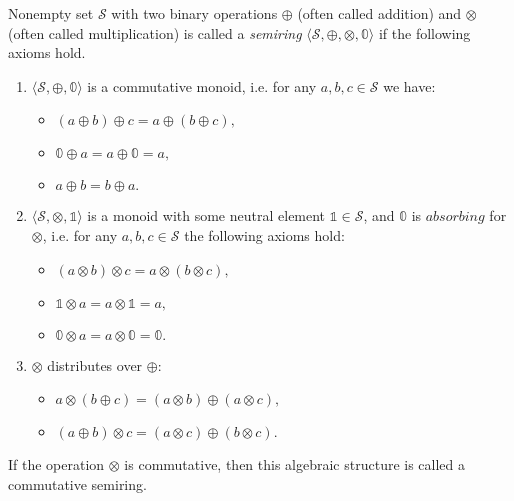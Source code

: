 %
%
%
\begin{definition}[A semiring]

Nonempty set $\mathcal{S}$ with two binary operations $\oplus$ (often called addition) and $\otimes$ (often called multiplication) is called a \emph{semiring} $\langle \mathcal{S}, \oplus, \otimes, \mathbb{0} \rangle$ if the following axioms hold.
\begin{enumerate}

\item $\langle \mathcal{S}, \oplus, \mathbb{0} \rangle$ is a commutative monoid, i.e. for any $a, b, c \in \mathcal{S}$ we have:
\begin{itemize}
	\item $(a \oplus b) \oplus c = a \oplus (b \oplus c),$
	\item $\mathbb{0} \oplus a = a \oplus \mathbb{0} = a,$
	\item $a \oplus b = b \oplus a.$
\end{itemize}

\item $\langle \mathcal{S}, \otimes, \mathbb{1} \rangle$ is a monoid with some neutral element $\mathbb{1} \in \mathcal{S}$, and $\mathbb{0}$ is $\textit{absorbing}$ for $\otimes$, i.e. for any $a, b, c \in \mathcal{S}$ the following axioms hold:
\begin{itemize}
	\item $(a \otimes b) \otimes c = a \otimes (b \otimes c),$
    \item $\mathbb{1} \otimes a = a \otimes \mathbb{1} = a,$
    \item $\mathbb{0} \otimes a = a \otimes \mathbb{0} = \mathbb{0}.$
\end{itemize}

\item $\otimes$ distributes over $\oplus$:
\begin{itemize}
	\item $a \otimes (b \oplus c) = (a \otimes b) \oplus (a \otimes c),$
    \item $(a \oplus b) \otimes c = (a \otimes c) \oplus (b \otimes c).$
\end{itemize}

\end{enumerate}

 If the operation $\otimes$ is commutative, then this algebraic structure is called a commutative semiring.

\end{definition}

